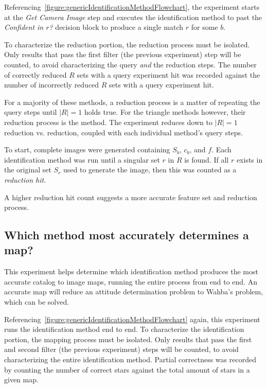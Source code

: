 Referencing~\autoref{figure:genericIdentificationMethodFlowchart}, the experiment starts at the \textit{Get Camera
Image} step and executes the identification method to past the \textit{Confident in $r$?} decision block to produce a
single match $r$ for some $b$.

To characterize the reduction portion, the reduction process must be isolated.
Only results that pass the first filter (the previous experiment) step will be counted, to avoid characterizing the
query \textit{and} the reduction steps.
The number of correctly reduced $R$ sets with a query experiment hit was recorded against the number of incorrectly
reduced $R$ sets with a query experiment hit.

For a majority of these methods, a reduction process is a matter of repeating the query steps until $|R|=1$ holds true.
For the triangle methods however, their reduction process is the  method.
The experiment reduces down to $|R|=1$ reduction vs.  reduction, coupled with each individual method's
query steps.

To start, complete images were generated containing $S_b$, $c_b$, and $f$.
Each identification method was run until a singular set $r$ in $R$ is found.
If all $r$ exists in the original set $S_r$ used to generate the image, then this was counted as a
\textit{reduction hit}.

A higher reduction hit count suggests a more accurate feature set and reduction process.

\subsection{Which method most accurately determines a map?}\label{subsec:identificationMethods}
This experiment helps determine which identification method produces the most accurate catalog to image maps, running
the entire process from end to end.
An accurate map will reduce an attitude determination problem to Wahba's problem, which can be solved.

Referencing~\autoref{figure:genericIdentificationMethodFlowchart} again, this experiment runs the identification
method end to end.
To characterize the identification portion, the mapping process must be isolated.
Only results that pass the first and second filter (the previous experiment) steps will be counted, to avoid
characterizing the entire identification method.
Partial correctness was recorded by counting the number of correct stars against the total amount of stars in a given
map.

